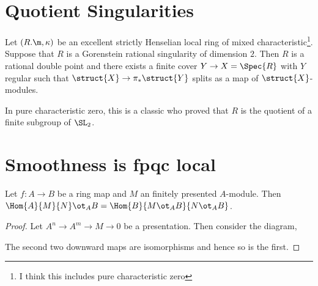 \documentclass[12pt]{article}
\begin{document}
\section{Quotient Singularities}

\begin{theorem}
Let $(R. \m, \kappa)$ be an excellent strictly Henselian local ring of mixed characteristic\footnote{I think this includes pure characteristic zero}. Suppose that $R$ is a Gorenstein rational singularity of dimension $2$. Then $R$ is a rational double point and there exists a finite cover $Y \to X = \Spec{R}$ with $Y$ regular such that $\struct{X} \to \pi_* \struct{Y}$ splits as a map of $\struct{X}$-modules. 
\end{theorem}

\begin{rmk}
In pure characteristic zero, this is a classic  who proved that $R$ is the quotient of a finite subgroup of $\SL_2$. 
\end{rmk}


\section{Smoothness is fpqc local}

\begin{lemma}
Let $f : A \to B$ be a ring map and $M$ an finitely presented $A$-module. Then $\Hom{A}{M}{N} \ot_A B = \Hom{B}{M \ot_A B}{N \ot_A B}$.
\end{lemma}

\begin{proof}
Let $A^n \to A^m \to M \to 0$ be a presentation. Then consider the diagram,
\begin{center}
\end{center}
The second two downward maps are isomorphisms and hence so is the first.
\end{proof}
\end{document}
